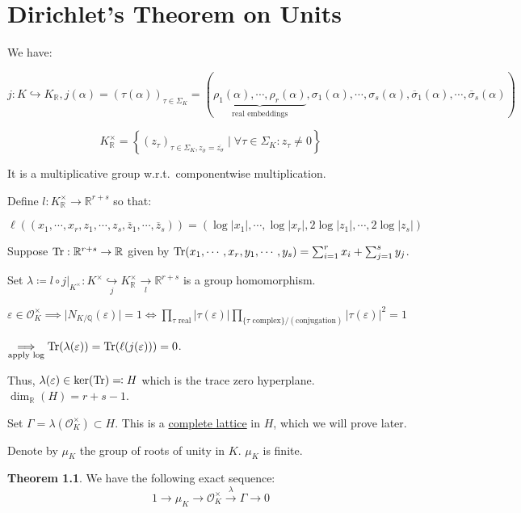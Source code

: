 \documentclass[openany]{amsbook}
\numberwithin{section}{chapter}
\theoremstyle{definition}
\newtheorem{theorem}{Theorem}[chapter]
\begin{document}
\chapter{Dirichlet's Theorem on Units}

We have:

\[
    j : K \hookrightarrow K_{\mathbb{R}}, j(\alpha) = (\tau(\alpha))_{\tau\in \Sigma_K} = (\underbrace{\rho_1(\alpha),\cdots,\rho_r(\alpha)}_{\text{real embeddings}}, \sigma_1(\alpha),\cdots ,\sigma_s(\alpha), \overline{\sigma}_1(\alpha),\cdots,\overline{\sigma}_s(\alpha))
\] 

\[
    K_\mathbb{R}^\times = \left\{ (z_\tau)_{\tau \in \Sigma_K, z_{\overline{\sigma}} = \overline{z_\sigma} } \mid \forall \tau \in \Sigma_K : z_\tau \neq 0 \right\} 
\]

It is a multiplicative group w.r.t.\ componentwise multiplication.

Define \(l:K_{\mathbb{R}}^\times \to \mathbb{R}^{r+s}\) so that:

\[
    \ell((x_1, \cdots , x_r, z_1, \cdots , z_s, \overline{z}_1, \cdots , \overline{z}_s)) = (\log \vert x_1 \vert , \cdots , \log \vert x_r \vert, 2 \log \vert z_1 \vert, \cdots , 2 \log \vert z_s \vert)
\]

Suppose \(\Tr:\mathbb{R}^{r+s}\to \mathbb{R}\) given by \(\Tr(x_1, \cdots , x_r, y_1, \cdots , y_s) = \sum_{i=1}^r x_i + \sum_{j=1}^s y_j\).

Set \(\lambda \coloneqq l \circ j|_{K^\times} : K^\times \underset{j}{\hookrightarrow} K^\times_\mathbb{R} \underset{l}{\to} \mathbb{R}^{r+s} \) is a group homomorphism.

\(\varepsilon \in \mathcal{O}_K^\times \implies \vert N_{K / \mathbb{Q}}(\varepsilon) \vert = 1 \iff \prod_{\tau \text{ real}} \vert \tau(\varepsilon) \vert \prod_{\{ \tau \text{ complex}  \} / (\text{conjugation}) } \vert \tau (\varepsilon) \vert ^2 = 1 \)

\(\underset{\text{apply log}}{\implies} \Tr (\lambda (\varepsilon)) = \Tr(\ell(j(\varepsilon))) = 0\).

Thus, \(\lambda (\varepsilon) \in \ker (\Tr) \eqqcolon  H\) which is the trace zero hyperplane. \(\dim_{\mathbb{R}}(H) = r+s-1\).

Set \(\Gamma = \lambda(\mathcal{O}_K^\times) \subset H\). This is a \underline{complete lattice} in \(H\), which we will prove later.

Denote by \(\mu_K\) the group of roots of unity in \(K\). \(\mu_K\) is finite.

\begin{theorem} We have the following exact sequence:
    \[
        1 \to \mu_K \to \mathcal{O}_K^\times \overset{\lambda}{\to} \Gamma \to 0
    \]
\end{theorem}
\end{document}
